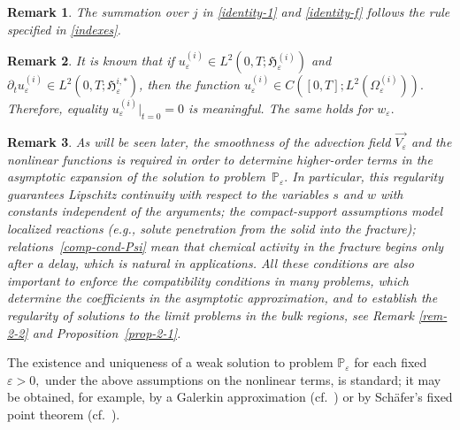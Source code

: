 \documentclass[reqno]{amsart}            %
\newtheorem{remark}{Remark}[section]
\numberwithin{equation}{section}
\begin{document}
	\begin{remark}
		The summation over $j$ in \eqref{identity-1} and \eqref{identity-f}
		follows the rule specified in \eqref{indexes}. 
	\end{remark}
	
	\begin{remark}
		It is known that if 
		$u^{(i)}_\varepsilon \in L^2(0,T; \mathfrak{H}^{(i)}_\varepsilon)$ and $\partial_t u^{(i)}_\varepsilon \in L^2(0,T; \mathfrak{H}^{i, *}_\varepsilon)$, then the function $u^{(i)}_\varepsilon \in C([0,T]; L^2(\Omega^{(i)}_\varepsilon)).$ Therefore,
		equality $u^{(i)}_\varepsilon|_{t=0}= 0$ is meaningful. The same holds for $w_\varepsilon.$
	\end{remark}
	
	\begin{remark}\label{rem-1-7}
		As will be seen later, the smoothness of the advection field $\overrightarrow{V_\varepsilon}$ and the nonlinear functions is required in order to determine higher-order terms in the asymptotic expansion of the solution to problem~$\mathbb{P}_\varepsilon.$ 
		In particular, this regularity guarantees Lipschitz continuity with respect to the variables 
		$s$ and $w$ with constants independent of the arguments; the compact-support assumptions model localized reactions (e.g., solute penetration from the solid into the fracture); relations~\eqref{comp-cond-Psi} mean that chemical activity in the fracture begins only after a delay, which is natural in applications. All these conditions are also important to enforce the compatibility conditions  in many problems, which determine the coefficients in the asymptotic approximation, and to establish the regularity of solutions to the limit problems in the bulk regions, see Remark \ref{rem-2-2} and  Proposition~\ref{prop-2-1}. 
	\end{remark}
	
	
	
	The existence and uniqueness of a weak solution to problem $\mathbb{P}_\varepsilon$ for each fixed $\varepsilon>0,$ under the above assumptions on the nonlinear terms, is standard; it may be obtained, for example, by a Galerkin approximation (cf.\ \cite[Sect.~3]{Mel-Roh_Non-Diff-2024}) or by Sch\"afer's fixed point theorem (cf.\ \cite[Prop.~1]{Gahn-Radu-2018}).
	
	\medskip
	
\end{document}
